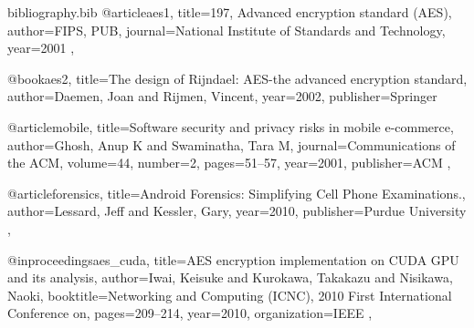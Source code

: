 \documentclass[conference,10pt]{IEEEtran}
\begin{document}
\begin{filecontents*}{bibliography.bib}
    @article{aes1,
        title={{197, Advanced encryption standard (AES)}},
        author={FIPS, PUB},
        journal={National Institute of Standards and Technology},
        year={2001}
    },

    @book{aes2,
        title={The design of Rijndael: AES-the advanced encryption standard},
        author={Daemen, Joan and Rijmen, Vincent},
        year={2002},
        publisher={Springer}
    }

    @article{mobile,
        title={Software security and privacy risks in mobile e-commerce},
        author={Ghosh, Anup K and Swaminatha, Tara M},
        journal={Communications of the ACM},
        volume={44},
        number={2},
        pages={51--57},
        year={2001},
        publisher={ACM}
    },

    @article{forensics,
        title={Android Forensics: Simplifying Cell Phone Examinations.},
        author={Lessard, Jeff and Kessler, Gary},
        year={2010},
        publisher={Purdue University}
    },

    @inproceedings{aes_cuda,
        title={{AES encryption implementation on CUDA GPU and its analysis}},
        author={Iwai, Keisuke and Kurokawa, Takakazu and Nisikawa, Naoki},
        booktitle={Networking and Computing (ICNC), 2010 First International Conference on},
        pages={209--214},
        year={2010},
        organization={IEEE}
    },

\end{filecontents*}

% 



\end{document}
